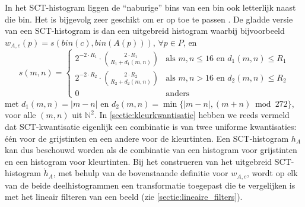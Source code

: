 In het SCT-histogram liggen de ``naburige'' bins van een bin ook letterlijk naast
die bin. Het is bijgevolg zeer geschikt om er
 op toe te passen \cite{sural:perceptually_smooth_histogram}. De gladde versie van
een SCT-histogram is dan een uitgebreid histogram waarbij bijvoorbeeld 
$w_{A,c}(p)=s(bin(c),bin(A(p)))$, $\forall p \in P$, en
\begin{displaymath}
s(m,n)=
\begin{cases}
2^{-2 \cdot R_1} \cdot \binom{2 \cdot R_1}{R_1 + d_1(m,n)} & \textrm{als } m, n \le 16 \textrm{ en } d_1(m,n) \le R_1 \\[4pt]
2^{-2 \cdot R_2} \cdot \binom{2 \cdot R_2}{R_2 + d_2(m,n)} & \textrm{als } m, n > 16 \textrm{ en } d_2(m,n) \le R_2 \\[4pt]
0 & \textrm{anders}
\end{cases}
\end{displaymath}
met $d_1(m,n)=|m-n|$ en $d_2(m,n)=\min\{|m-n|, (m+n) \bmod 272\}$,
voor alle $(m,n)$ uit $\mathbb{N}^2$. In \ref{sectie:kleurkwantisatie} hebben 
we reeds vermeld dat SCT-kwantisatie eigenlijk een combinatie is van twee 
uniforme kwantisaties: \'e\'en voor de grijstinten en een andere voor de 
kleurtinten. Een SCT-histogram $h_A$ kan dus beschouwd 
worden als de combinatie van een histogram voor grijstinten en een histogram 
voor kleurtinten. 
Bij het construeren van het uitgebreid SCT-histogram $\mathring{h}_A$, met behulp van de bovenstaande 
definitie voor $w_{A,c}$, wordt op elk van de beide deelhistogrammen een 
transformatie toegepast die te vergelijken is met het lineair filteren van
een beeld (zie \ref{sectie:lineaire_filters}). 

